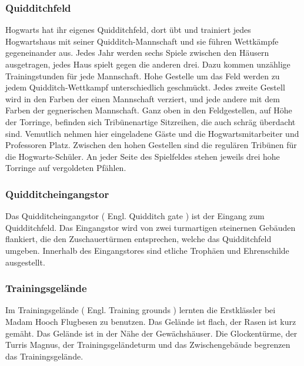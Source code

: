 \documentclass[a4paper, 10pt]{article}
\begin{document}
\subsubsection*{\large Quidditchfeld}
Hogwarts hat ihr eigenes Quidditchfeld, dort übt und trainiert jedes Hogwartshaus mit seiner Quidditch-Mannschaft und sie führen Wettkämpfe gegeneinander aus. Jedes Jahr werden sechs Spiele zwischen den Häusern ausgetragen, jedes Haus spielt gegen die anderen drei. Dazu kommen unzählige Trainingstunden für jede Mannschaft.
\vspace{10pt}
\newline
Hohe Gestelle um das Feld werden zu jedem Quidditch-Wettkampf unterschiedlich geschmückt. Jedes zweite Gestell wird in den Farben der einen Mannschaft verziert, und jede andere mit dem Farben der gegnerischen Mannschaft. Ganz oben in den Feldgestellen, auf Höhe der Torringe, befinden sich Tribünenartige Sitzreihen, die auch schräg überdacht sind. Vemutlich nehmen hier eingeladene Gäste und die Hogwartsmitarbeiter und Professoren Platz. Zwischen den hohen Gestellen sind die regulären Tribünen für die Hogwarts-Schüler.
\vspace{10pt}
\newline
An jeder Seite des Spielfeldes stehen jeweils drei hohe Torringe auf vergoldeten Pfählen.
\subsubsection*{\large Quidditcheingangstor}
Das Quidditcheingangstor (  Engl.  Quidditch gate ) ist der Eingang zum Quidditchfeld. Das Eingangstor wird von zwei turmartigen steinernen Gebäuden flankiert, die den Zuschauertürmen entsprechen, welche das Quidditchfeld umgeben. Innerhalb des Eingangstores sind etliche Trophäen und Ehrenschilde ausgestellt.
\subsubsection*{\large Trainingsgelände}
Im Trainingsgelände (  Engl.  Training grounds ) lernten die Erstklässler bei Madam Hooch Flugbesen zu benutzen. Das Gelände ist flach, der Rasen ist kurz gemäht. Das Gelände ist in der Nähe der Gewächshäuser. Die Glockentürme, der Turris Magnus, der Trainingsgeländeturm und das Zwischengebäude begrenzen das Trainingsgelände.
\end{document}
